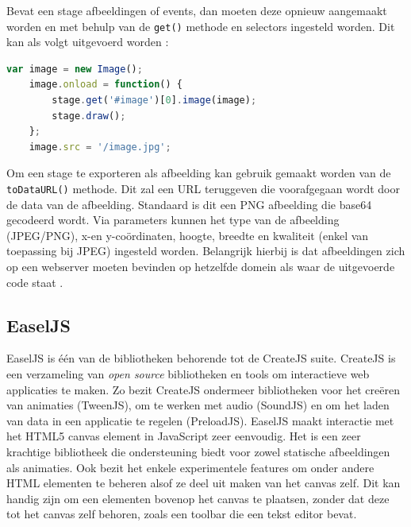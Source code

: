 Bevat een stage afbeeldingen of events, dan moeten deze opnieuw aangemaakt worden en met behulp van de \texttt{get()} methode en selectors ingesteld worden. Dit kan als volgt uitgevoerd worden \cite{KonvaLoad}:

\begin{lstlisting}[language=javascript]
	var image = new Image();
    image.onload = function() {
        stage.get('#image')[0].image(image);
        stage.draw();
    };
    image.src = '/image.jpg';
\end{lstlisting}

Om een stage te exporteren als afbeelding kan gebruik gemaakt worden van de \texttt{toDataURL()} methode. Dit zal een URL teruggeven die voorafgegaan wordt door de data van de afbeelding. Standaard is dit een PNG afbeelding die base64 gecodeerd wordt. Via parameters kunnen het type van de afbeelding (JPEG/PNG), x-en y-co\"{o}rdinaten, hoogte, breedte en kwaliteit (enkel van toepassing bij JPEG) ingesteld worden. Belangrijk hierbij is dat afbeeldingen zich op een webserver moeten bevinden op hetzelfde domein als waar de uitgevoerde code staat \cite{KonvaToImage}. 

\subsection{EaselJS} \label{easeljs}
EaselJS is \'{e}\'{e}n van de bibliotheken behorende tot de CreateJS suite. CreateJS is een verzameling van \textit{open source} bibliotheken en tools om interactieve web applicaties te maken. Zo bezit CreateJS ondermeer bibliotheken voor het cre\"{e}ren van animaties (TweenJS), om te werken met audio (SoundJS) en om het laden van data in een applicatie te regelen (PreloadJS). EaselJS maakt interactie met het HTML5 canvas element in JavaScript zeer eenvoudig. Het is een zeer krachtige bibliotheek die ondersteuning biedt voor zowel statische afbeeldingen als animaties. Ook bezit het enkele experimentele features om onder andere HTML elementen te beheren alsof ze deel uit maken van het canvas zelf. Dit kan handig zijn om een elementen bovenop het canvas te plaatsen, zonder dat deze tot het canvas zelf behoren, zoals een toolbar die een tekst editor bevat. 

